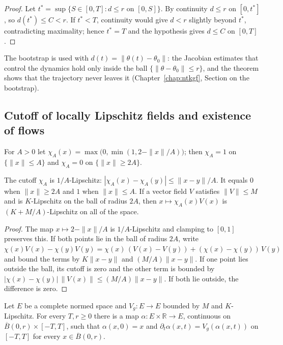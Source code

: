 \begin{proof}
  \leanok
Let $t^\ast=\sup\{S\in[0,T]: d\le r\text{ on }[0,S]\}$. By continuity $d\le r$ on $[0,t^\ast]$,
so $d(t^\ast)\le C<r$. If $t^\ast<T$, continuity would give $d<r$ slightly beyond $t^\ast$,
contradicting maximality; hence $t^\ast=T$ and the hypothesis gives $d\le C$ on $[0,T]$.
\end{proof}

\begin{remark}
The bootstrap is used with $d(t)=\|\theta(t)-\theta_0\|$: the Jacobian estimates that control the
dynamics hold only inside the ball $\{\|\theta-\theta_0\|\le r\}$, and the theorem shows that the
trajectory never leaves it (Chapter~\ref{chap:ntkgf}, Section on the bootstrap).
\end{remark}

\subsection{Cutoff of locally Lipschitz fields and existence of flows}

For $A>0$ let $\chi_A(x)=\max\bigl(0,\min(1,2-\|x\|/A)\bigr)$; then $\chi_A=1$ on $\{\|x\|\le A\}$
and $\chi_A=0$ on $\{\|x\|\ge2A\}$.

\begin{lemma}\label{lem:ntkf:cutoff}
  \leanok
The cutoff $\chi_A$ is $1/A$-Lipschitz: $|\chi_A(x)-\chi_A(y)|\le\|x-y\|/A$. It equals $0$ when
$\|x\|\ge2A$ and $1$ when $\|x\|\le A$. If a vector field $V$ satisfies $\|V\|\le M$ and is
$K$-Lipschitz on the ball of radius $2A$, then $x\mapsto\chi_A(x)V(x)$ is
$(K+M/A)$-Lipschitz on all of the space.
\end{lemma}

\begin{proof}
  \leanok
The map $x\mapsto2-\|x\|/A$ is $1/A$-Lipschitz and clamping to $[0,1]$ preserves this. If both points
lie in the ball of radius $2A$, write
$\chi(x)V(x)-\chi(y)V(y)=\chi(x)\,(V(x)-V(y))+(\chi(x)-\chi(y))\,V(y)$ and bound the terms by $K\|x-y\|$ and
$(M/A)\|x-y\|$. If one point lies outside the ball, its cutoff is zero and the other term is bounded
by $|\chi(x)-\chi(y)|\,\|V(x)\|\le(M/A)\|x-y\|$. If both lie outside, the difference is zero.
\end{proof}

\begin{lemma}\label{lem:ntkf:flowLipschitz}
  \leanok
Let $E$ be a complete normed space and $V_g:E\to E$ bounded by $M$ and $K$-Lipschitz. For every
$T,r\ge0$ there is a map $\alpha:E\times\mathbb R\to E$, continuous on
$\overline B(0,r)\times[-T,T]$, such that $\alpha(x,0)=x$ and
$\partial_t\alpha(x,t)=V_g(\alpha(x,t))$ on $[-T,T]$ for every $x\in\overline B(0,r)$.
\end{lemma}

